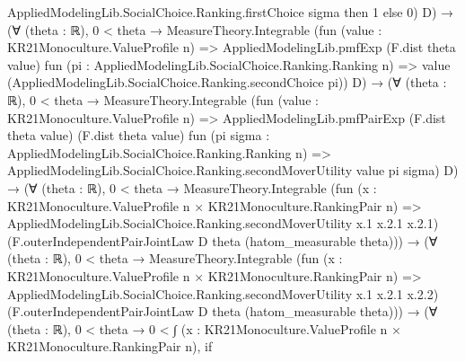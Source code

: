 \documentclass[10pt]{article}
\begin{document}
\begin{ReviewVerbatim}
                                        AppliedModelingLib.SocialChoice.Ranking.firstChoice sigma then
                                    1
                                  else 0)
                              D) →
                        (∀ (theta : ℝ),
                            0 < theta →
                              MeasureTheory.Integrable
                                (fun (value : KR21Monoculture.ValueProfile n) =>
                                  AppliedModelingLib.pmfExp (F.dist theta value)
                                    fun (pi : AppliedModelingLib.SocialChoice.Ranking.Ranking n) =>
                                    value (AppliedModelingLib.SocialChoice.Ranking.secondChoice pi))
                                D) →
                          (∀ (theta : ℝ),
                              0 < theta →
                                MeasureTheory.Integrable
                                  (fun (value : KR21Monoculture.ValueProfile n) =>
                                    AppliedModelingLib.pmfPairExp (F.dist theta value) (F.dist theta value)
                                      fun (pi sigma : AppliedModelingLib.SocialChoice.Ranking.Ranking n) =>
                                      AppliedModelingLib.SocialChoice.Ranking.secondMoverUtility value pi sigma)
                                  D) →
                            (∀ (theta : ℝ),
                                0 < theta →
                                  MeasureTheory.Integrable
                                    (fun (x : KR21Monoculture.ValueProfile n × KR21Monoculture.RankingPair n) =>
                                      AppliedModelingLib.SocialChoice.Ranking.secondMoverUtility x.1 x.2.1 x.2.1)
                                    (F.outerIndependentPairJointLaw D theta (hatom_measurable theta))) →
                              (∀ (theta : ℝ),
                                  0 < theta →
                                    MeasureTheory.Integrable
                                      (fun (x : KR21Monoculture.ValueProfile n × KR21Monoculture.RankingPair n) =>
                                        AppliedModelingLib.SocialChoice.Ranking.secondMoverUtility x.1 x.2.1 x.2.2)
                                      (F.outerIndependentPairJointLaw D theta (hatom_measurable theta))) →
                                (∀ (theta : ℝ),
                                    0 < theta →
                                      0 <
                                        ∫ (x : KR21Monoculture.ValueProfile n × KR21Monoculture.RankingPair n),
                                          if

\end{ReviewVerbatim}
\end{document}
